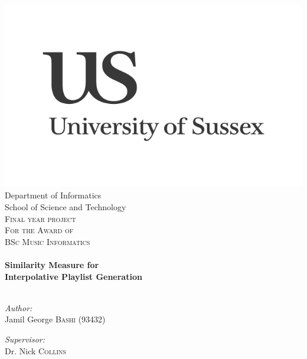 \begin{titlepage}
\begin{center}
\includegraphics[width=0.5\linewidth]{front/images/us-logo}\\
\small Department of Informatics\\
School of Science and Technology\\[2cm]

\textsc{\Large Final year project\\
\small For the Award of\\
\Large BSc Music Informatics}\\[1cm]

\hrulefill \\[0.8cm]
{ \huge \bfseries Similarity Measure for\\
Interpolative Playlist Generation}\\[0.8cm]

\hrulefill \\[2.5cm]
\begin{minipage}{0.45\textwidth}
\begin{flushleft} \large
\emph{Author:}\\
Jamil George \textsc{Bashi} (93432)
\end{flushleft}
\end{minipage}
\begin{minipage}{0.45\textwidth}
\begin{flushright} \large
\emph{Supervisor:} \\
Dr. Nick \textsc{Collins}
\end{flushright}
\end{minipage}
\end{center}
\end{titlepage}
